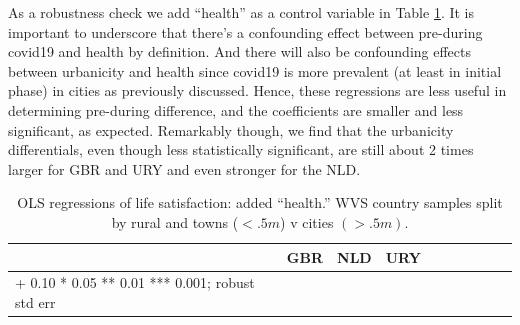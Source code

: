 \documentclass[10pt, letterpaper]{article}
\begin{document}
\begin{spacing}{1.4}
As a robustness check we add ``health'' as a control variable in Table
\ref{c}. It is important to underscore that there's a confounding effect between
pre-during covid19 and health by definition. And there will also be confounding
effects between urbanicity and health since covid19 is more prevalent (at least
in initial phase) in cities as previously discussed.  Hence, these regressions are less useful in
determining pre-during difference, and the coefficients are smaller and less significant, as expected.
Remarkably though, we find that the urbanicity differentials, even though less statistically significant, are still about 2 times larger for GBR and URY and even stronger for the NLD.


\begin{spacing}{.9} \begin{table}[H]\centering   \begin{scriptsize} \begin{tabular}{p{1.8in}p{.5in}p{.5in}|p{.5in}p{.5in}|p{.5in}p{.5in}|p{.5in}p{.5in}p{.5in}p{.5
                                                                      in}p{.5in}p{.5
                                                                      in}}\hline\hline&\multicolumn{2}{c}{GBR}&\multicolumn{2}{c}{NLD}&\multicolumn{2}{c}{URY}\\
                                                                      
                                                                      \hline +
                                                                      0.10 *
                                                                      0.05 **
                                                                      0.01 ***
                                                                      0.001;
                                                                      robust std
                                                                      err \end{tabular}\end{scriptsize}\caption{\label{c}OLS
                                                                    regressions
                                                                    of life
                                                                    satisfaction:
                                                                    added ``health.'' WVS
                                                                   country
                                                                   samples split
                                                                 by rural and towns ($<.5m$) v cities $(>.5m)$.}\end{table} \end{spacing}



\end{spacing}
\end{document}
